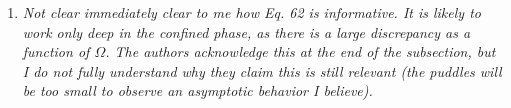 \documentclass[
onecolumn,
superscriptaddress,
longbibliography,
nofootinbib,
 amsmath,amssymb,
 aps,
prb
]{revtex4-2}
\newcommand{\response}[1]{\textcolor{Mulberry}{#1}}
\begin{document}
\begin{enumerate}
\item \textit{Not clear immediately clear to me how Eq. 62 is informative. It is
likely to work only deep in the confined phase, as there is a large
discrepancy as a function of $\Omega$. The authors acknowledge this at
the end of the subsection, but I do not fully understand why they
claim this is still relevant (the puddles will be too small to observe
an asymptotic behavior I believe). 
}



\end{enumerate}
\end{document}
